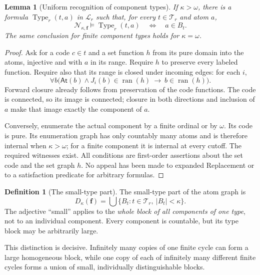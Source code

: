 \documentclass[11pt,letterpaper]{article}
\numberwithin{equation}{section}
\theoremstyle{plain}
\newtheorem{lemma}[lemma]{Lemma}
\theoremstyle{definition}
\newtheorem{definition}[definition]{Definition}
\theoremstyle{remark}
\newcommand{\At}{\mathsf{At}}
\newcommand{\ran}{\operatorname{ran}}
\newcommand{\Langr}{\mathcal L_r}
\begin{document}
\begin{lemma}[Uniform recognition of component types]\label{nee:lem:recognize}
If $\kappa>\omega$, there is a formula $\operatorname{Type}_r(t,a)$ in $\Langr$ such that, for every $t\in\mathcal T_r$ and atom $a$,
\[
\mathcal N_{\kappa,\boldsymbol f}\models\operatorname{Type}_r(t,a)
\quad\Longleftrightarrow\quad a\in B_t.
\]
The same conclusion for finite component types holds for $\kappa=\omega$.
\end{lemma}
\begin{proof}
Ask for a code $c\in t$ and a set function $h$ from its pure domain into the atoms, injective and with $a$ in its range. Require $h$ to preserve every labeled function. Require also that its range is closed under incoming edges: for each $i$,
\[
\forall b\bigl(\At(b)\land J_i(b)\in\ran(h)\ \longrightarrow\ b\in\ran(h)\bigr).
\]
Forward closure already follows from preservation of the code functions. The code is connected, so its image is connected; closure in both directions and inclusion of $a$ make that image exactly the component of $a$.

Conversely, enumerate the actual component by a finite ordinal or by $\omega$. Its code is pure. Its enumeration graph has only countably many atoms and is therefore internal when $\kappa>\omega$; for a finite component it is internal at every cutoff. The required witnesses exist. All conditions are first-order assertions about the set code and the set graph $h$. No appeal has been made to expanded Replacement or to a satisfaction predicate for arbitrary formulas.
\end{proof}

\begin{definition}[The small-type part]\label{nee:def:small}
The small-type part of the atom graph is
\begin{equation}\label{nee:eq:small}
D_\kappa(\boldsymbol f)=\bigcup\{B_t:t\in\mathcal T_r,\ |B_t|<\kappa\}.
\end{equation}
The adjective ``small'' applies to the \emph{whole block of all components of one type}, not to an individual component. Every component is countable, but its type block may be arbitrarily large.
\end{definition}

This distinction is decisive. Infinitely many copies of one finite cycle can form a large homogeneous block, while one copy of each of infinitely many different finite cycles forms a union of small, individually distinguishable blocks.
\end{document}
